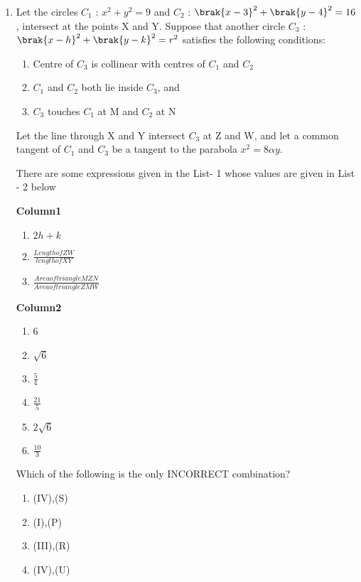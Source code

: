 \documentclass[journal,12pt,twocolumn]{IEEEtran}
\theoremstyle{remark}
\begin{document}
\begin{enumerate}
\item Let the circles $C_{1}$ : $x^2+y^2=9$ and $C_{2}$ : $\brak{x-3}^2+\brak{y-4}^2=16$, intersect at the points X and Y. Suppose that another circle $C_{3}$ : $\brak{x-h}^2+\brak{y-k}^2=r^2$ satisfies the following conditions: 

\begin{enumerate}[label=(\roman*)]                       
\item Centre of $C_{3}$ is collinear with centres of $C_{1}$ and $C_{2}$                         
\item $C_{1}$ and $C_{2}$ both lie inside $C_{3}$, and                                            
\item $C_{3}$ touches $C_{1}$ at M and $C_{2}$ at N
\end{enumerate}                              
Let the line through X and Y intersect $C_{3}$ at Z and W, and let a common tangent of $C_{1}$ and $C_{3}$ be a tangent to the parabola $x^2=8\alpha y$.

There are some expressions given in the List- 1 whose values are given in List - 2 below
\begin{multicols}


	\textbf{Column{1}}

\begin{enumerate}[label=(\Alph*)]

 \item $2h+k$
 \item $\frac{Length of ZW}{length of XY}$
 \item $\frac{Area of triangle MZN}{Area of triangle ZMW}$                     \end{enumerate}                             
 \columnbreak
 \textbf{Column{2}}

 \begin{enumerate}[label=(\alph*) , start=16]                                              
 \item 6                                      
 \item $\sqrt{6}$                              
 \item $\frac{5}{4}$                          
 \item $\frac{21}{5}$                          
 \item $2\sqrt{6}$               
 \item $\frac{10}{3}$                         
 \end{enumerate}     
 \end{multicols}
 Which of the following is the only INCORRECT combination?


\begin{enumerate}[label=(\alph*)] 
 \item (IV),(S)
 \item (I),(P)
 \item (III),(R)    
 \item (IV),(U)
  
  \end{enumerate}
  \end{enumerate}
 
 
\end{document}
